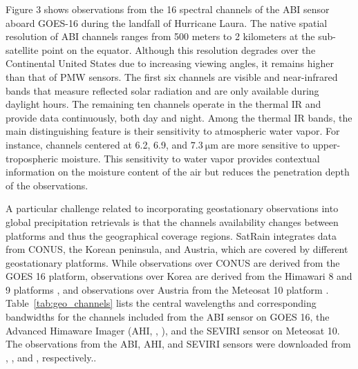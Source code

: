 \documentclass[11pt]{article}
\begin{document}
Figure 3 shows observations from the 16 spectral channels of the ABI sensor
aboard GOES-16 during the landfall of Hurricane Laura. The native spatial
resolution of ABI channels ranges from 500 meters to 2 kilometers at the
sub-satellite point on the equator. Although this resolution degrades over the
Continental United States due to increasing viewing angles, it remains higher
than that of PMW sensors. The first six channels are visible and near-infrared
bands that measure reflected solar radiation and are only available during
daylight hours. The remaining ten channels operate in the thermal IR and provide
data continuously, both day and night. Among the thermal IR bands, the main
distinguishing feature is their sensitivity to atmospheric water vapor. For
instance, channels centered at 6.2, 6.9, and $\SI{7.3}{\micro \meter}$ are more
sensitive to upper-tropospheric moisture. This sensitivity to water vapor
provides contextual information on the moisture content of the air but reduces
the penetration depth of the observations.

A particular challenge related to incorporating geostationary observations into
global precipitation retrievals is that the channels availability changes
between platforms and thus the geographical coverage regions. SatRain integrates
data from CONUS, the Korean peninsula, and Austria, which are covered by
different geostationary platforms. While observations over CONUS are derived
from the GOES 16 \citep{Goodman2019Goes} platform, observations over Korea are
derived from the Himawari 8 and 9 platforms \citep{Bessho2016Himawari}, and
observations over Austria from the Meteosat 10 platform
\citep{Schmetz2002Introduction}. Table~\ref{tab:geo_channels} lists the central
wavelengths and corresponding bandwidths for the channels included from the ABI
sensor on GOES 16, the Advanced Himaware Imager (AHI,
\citeauthor{Da2015Preliminary}, \citeyear{Da2015Preliminary}), and the SEVIRI
\citep{Aminou2002Msg} sensor on Meteosat 10. The observations from the ABI, AHI,
and SEVIRI sensors were downloaded from \cite{NOAA_GOES_AWS},
\cite{NOAA_HIMAWARI_AWS}, and \cite{EUMETSAT_SEVIRI}, respectively..
\end{document}
